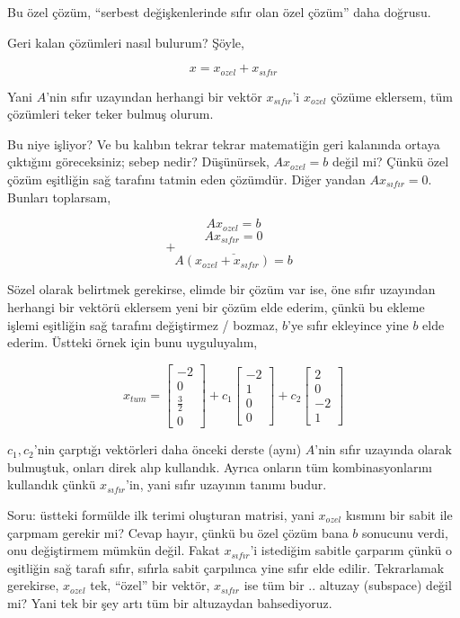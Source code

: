 \documentclass[12pt,fleqn]{article}\usepackage{../../common}
\begin{document}
Bu özel çözüm, ``serbest değişkenlerinde sıfır olan özel çözüm'' daha doğrusu. 

Geri kalan çözümleri nasıl bulurum?  Şöyle, 

$$ x = x_{ozel} + x_{sıfır} $$

Yani $A$'nin sıfır uzayından herhangi bir vektör $x_{sıfır}$'i $x_{ozel}$
çözüme eklersem, tüm çözümleri teker teker bulmuş olurum. 

Bu niye işliyor? Ve bu kalıbın tekrar tekrar matematiğin geri kalanında
ortaya çıktığını göreceksiniz; sebep nedir? Düşünürsek, $Ax_{ozel} = b$
değil mi? Çünkü özel çözüm eşitliğin sağ tarafını tatmin eden
çözümdür. Diğer yandan $Ax_{sıfır} = 0$. Bunları toplarsam,

$$ Ax_{ozel} = b $$
$$ Ax_{sıfır} = 0 $$
$$ \underline{+\hspace{10em}} $$
$$ A(x_{ozel} + x_{sıfır}) = b $$

Sözel olarak belirtmek gerekirse, elimde bir çözüm var ise, öne sıfır
uzayından herhangi bir vektörü eklersem yeni bir çözüm elde ederim, çünkü
bu ekleme işlemi eşitliğin sağ tarafını değiştirmez / bozmaz, $b$'ye sıfır
ekleyince yine $b$ elde ederim. Üstteki örnek için bunu uyguluyalım, 

$$ 
x_{tum} = 
\left[\begin{array}{r}
-2 \\ 0 \\ \frac{3}{2} \\ 0
\end{array}\right] + 
c_1 
\left[\begin{array}{r}
-2 \\ 1 \\ 0 \\ 0
\end{array}\right] + 
c_2 
\left[\begin{array}{r}
2 \\ 0 \\ -2 \\ 1
\end{array}\right] 
 $$

$c_1,c_2$'nin çarptığı vektörleri daha önceki derste (aynı) $A$'nin sıfır
uzayında olarak bulmuştuk, onları direk alıp kullandık. Ayrıca onların tüm
kombinasyonlarını kullandık çünkü $x_{sıfır}$'in, yani sıfır uzayının tanımı
budur.

Soru: üstteki formülde ilk terimi oluşturan matrisi, yani $x_{ozel}$
kısmını bir sabit ile çarpmam gerekir mi? Cevap hayır, çünkü bu özel çözüm
bana $b$ sonucunu verdi, onu değiştirmem mümkün değil. Fakat $x_{sıfır}$'i
istediğim sabitle çarparım çünkü o eşitliğin sağ tarafı sıfır, sıfırla
sabit çarpılınca yine sıfır elde edilir. Tekrarlamak gerekirse, $x_{ozel}$
tek, ``özel'' bir vektör, $x_{sıfır}$ ise tüm bir .. altuzay (subspace)
değil mi? Yani tek bir şey artı tüm bir altuzaydan bahsediyoruz.
\end{document}
